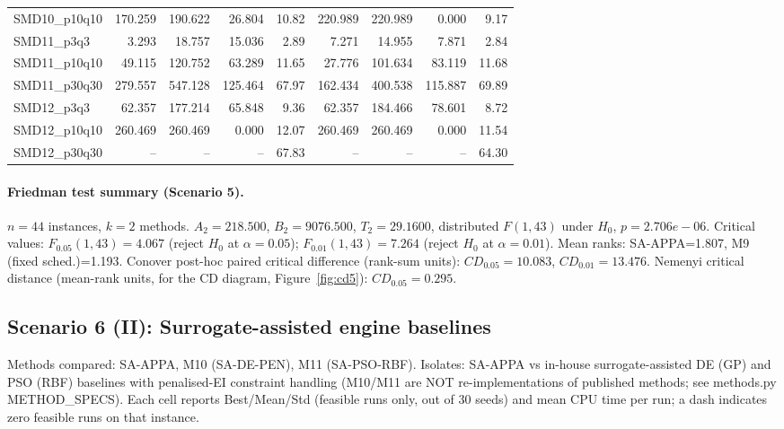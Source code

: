 \begin{longtable}{lrrrrrrrr}
SMD10\_p10q10 & 170.259 & 190.622 & 26.804 & 10.82 & 220.989 & 220.989 & 0.000 & 9.17 \\
SMD11\_p3q3 & 3.293 & 18.757 & 15.036 & 2.89 & 7.271 & 14.955 & 7.871 & 2.84 \\
SMD11\_p10q10 & 49.115 & 120.752 & 63.289 & 11.65 & 27.776 & 101.634 & 83.119 & 11.68 \\
SMD11\_p30q30 & 279.557 & 547.128 & 125.464 & 67.97 & 162.434 & 400.538 & 115.887 & 69.89 \\
SMD12\_p3q3 & 62.357 & 177.214 & 65.848 & 9.36 & 62.357 & 184.466 & 78.601 & 8.72 \\
SMD12\_p10q10 & 260.469 & 260.469 & 0.000 & 12.07 & 260.469 & 260.469 & 0.000 & 11.54 \\
SMD12\_p30q30 & -- & -- & -- & 67.83 & -- & -- & -- & 64.30 \\
\end{longtable}
\endgroup

\paragraph{Friedman test summary (Scenario 5).}
$n=44$ instances, $k=2$ methods. $A_2=218.500$, $B_2=9076.500$, $T_2=29.1600$, distributed $F(1,43)$ under $H_0$, $p=2.706e-06$. Critical values: $F_{0.05}(1,43)=4.067$ (reject $H_0$ at $\alpha=0.05$); $F_{0.01}(1,43)=7.264$ (reject $H_0$ at $\alpha=0.01$). Mean ranks: SA-APPA=1.807, M9 (fixed sched.)=1.193. Conover post-hoc paired critical difference (rank-sum units): $CD_{0.05}=10.083$, $CD_{0.01}=13.476$. Nemenyi critical distance (mean-rank units, for the CD diagram, Figure~\ref{fig:cd5}): $CD_{0.05}=0.295$.

\subsection{Scenario 6 (II): Surrogate-assisted engine baselines}
\label{app:scenario6}
Methods compared: SA-APPA, M10 (SA-DE-PEN), M11 (SA-PSO-RBF). Isolates: SA-APPA vs in-house surrogate-assisted DE (GP) and PSO (RBF) baselines with penalised-EI constraint handling (M10/M11 are NOT re-implementations of published methods; see methods.py METHOD\_SPECS). Each cell reports Best/Mean/Std (feasible runs only, out of 30 seeds) and mean CPU time per run; a dash indicates zero feasible runs on that instance.

